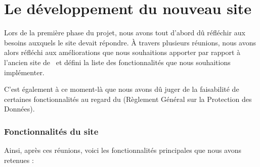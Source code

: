 \chapter{Le développement du nouveau site}
\label{chap:dev}




Lors de la première phase du projet, nous avons tout d'abord dû réfléchir aux besoins auxquels le site devait répondre.
À travers plusieurs réunions, nous avons alors réfléchi aux améliorations que nous souhaitions apporter par rapport à l’ancien site de \ofni\ et défini la liste des fonctionnalités que nous souhaitions implémenter.

C'est également à ce moment-là que nous avons dû juger de la faisabilité de certaines fonctionnalités au regard du  (Règlement Général sur la Protection des Données).

\subsection{Fonctionnalités du site}
\label{subsec:fonctionnalites}

Ainsi, après ces réunions, voici les fonctionnalités principales que nous avons retenues :


